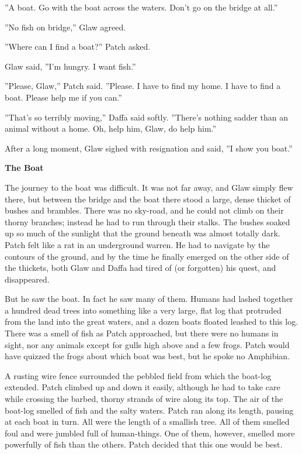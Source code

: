 \documentclass[11pt]{article}
\begin{document}
 ''A boat. Go with the boat across the waters. Don't go on the bridge at all.''\par
 ''No fish on bridge,'' Glaw agreed.\par
 ''Where can I find a boat?'' Patch asked.\par
 Glaw said, ''I'm hungry. I want fish.''\par
 ''Please, Glaw,'' Patch said. ''Please. I have to find my home. I have to find a boat. Please help me if you can.''\par
 ''That's so terribly moving,'' Daffa said softly. ''There's nothing sadder than an animal without a home. Oh, help him, Glaw, do help him.''\par
 After a long moment, Glaw sighed with resignation and said, ''I show you boat.''\par
\par
{\bf The Boat\par
}\par
 The journey to the boat was difficult. It was not far away, and Glaw simply flew there, but between the bridge and the boat there stood a large, dense thicket of bushes and brambles. There was no sky-road, and he could not climb on their thorny branches; instead he had to run through their stalks. The bushes soaked up so much of the sunlight that the ground beneath was almost totally dark. Patch felt like a rat in an underground warren. He had to navigate by the contours of the ground, and by the time he finally emerged on the other side of the thickets, both Glaw and Daffa had tired of (or forgotten) his quest, and disappeared.\par
 But he saw the boat. In fact he saw many of them. Humans had lashed together a hundred dead trees into something like a very large, flat log that protruded from the land into the great waters, and a dozen boats floated leashed to this log. There was a smell of fish as Patch approached, but there were no humans in sight, nor any animals except for gulls high above and a few frogs. Patch would have quizzed the frogs about which boat was best, but he spoke no Amphibian.\par
 A rusting wire fence surrounded the pebbled field from which the boat-log extended. Patch climbed up and down it easily, although he had to take care while crossing the barbed, thorny strands of wire along its top. The air of the boat-log smelled of fish and the salty waters. Patch ran along its length, pausing at each boat in turn. All were the length of a smallish tree. All of them smelled foul and were jumbled full of human-things. One of them, however, smelled more powerfully of fish than the others. Patch decided that this one would be best.\par
\end{document}
